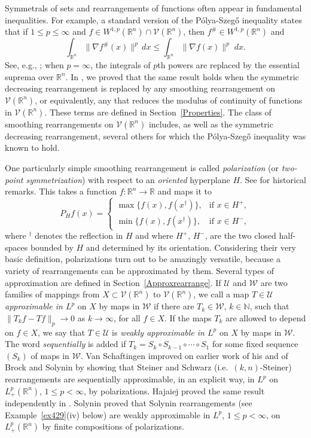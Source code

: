 \documentclass[12pt,reqno]{amsart}
\newcommand{\N}{{\mathbb N}}
\newcommand{\R}{{\mathbb R}}
\newcommand{\cV}{{\mathcal V}}
\newcommand{\cW}{{\mathcal W}}
\newcommand{\cU}{{\mathcal U}}
\numberwithin{equation}{section}
\begin{document}
Symmetrals of sets and rearrangements of functions often appear in fundamental inequalities.  For example, a standard version of the P\'olya-Szeg\H{o} inequality states that if $1\le p\le \infty$ and  $f\in W^{1,p}(\R^n)\cap \cV(\R^n)$, then $f^{\#}\in W^{1,p}(\R^n)$ and
$$
\int_{\R^n}\|\nabla f^{\#}(x)\|^p\, dx\leq \int_{\R^n}\|\nabla f(x)\|^p\; dx.
$$
See, e.g., \cite[Theorem~3.20 and~p.~113]{Baer}; when $p=\infty$, the integrals of $p$th powers are replaced by the essential suprema over $\R^n$. In \cite[Corollary~6.5]{BGGK2}, we proved that the same result holds when the symmetric decreasing rearrangement is replaced by any smoothing rearrangement on $\cV(\R^n)$, or equivalently, any that reduces the modulus of continuity of functions in $\cV(\R^n)$.  These terms are defined in Section~\ref{Properties}.  The class of smoothing rearrangements on $\cV(\R^n)$ includes, as well as the symmetric decreasing rearrangement, several others for which the P\'olya-Szeg\H{o} inequality was known to hold.

One particularly simple smoothing rearrangement is called {\em polarization} (or {\em two-point symmetrization}) with respect to an {\em oriented} hyperplane $H$.  See \cite[p.~3]{BGGK1} for historical remarks.  This takes a function $f:\R^n\to \R$ and maps it to
\begin{equation}\label{pol}
P_Hf(x)=\begin{cases}
\max\{f(x),f(x^{\dagger})\},& {\text{if $x\in H^+$,}}\\
\min\{f(x),f(x^{\dagger})\},& {\text{if $x\in H^-$}},
\end{cases}
\end{equation}
where $^{\dagger}$ denotes the reflection in $H$ and where $H^+$, $H^-$, are the two closed half-spaces bounded by $H$ and determined by its orientation.  Considering their very basic definition, polarizations turn out to be amazingly versatile, because a variety of rearrangements can be approximated by them. Several types of approximation are defined in Section~\ref{Approxrearrange}. If $\cU$ and $\cW$ are two families of mappings from $X\subset {\cV}(\R^n)$ to ${\cV}(\R^n)$, we call a map $T\in\cU$ {\em approximable in $L^p$} on $X$ by maps in $\cW$ if there are $T_k\in \cW$, $k\in \N$, such that $\|T_kf-Tf\|_p\to 0$ as $k\to \infty$, for all $f\in X$.  If the maps $T_k$ are allowed to depend on $f\in X$, we say that $T\in\cU$ is {\em weakly approximable in $L^p$} on $X$ by maps in $\cW$.  The word {\em sequentially} is added if $T_k=S_k\circ S_{k-1}\circ\cdots \circ S_1$ for some fixed sequence $(S_k)$ of maps in $\cW$.  Van Schaftingen \cite[Theorem~1]{VS2} improved on earlier work of his  \cite[Theorem~4.4]{VS1} and of Brock and Solynin \cite[Theorem~6.1]{BS} by showing that Steiner and Schwarz ({i.e.~$(k,n)$}-Steiner) rearrangements are sequentially approximable, in an explicit way, in $L^p$ on $L^p_+(\R^n)$, $1\le p<\infty$, by polarizations.  Hajaiej proved the same result independently in \cite{Haj}. Solynin \cite[Lemmas~7.4 and~9.2]{Sol1} proved that Solynin rearrangements (see Example~\ref{ex429}(iv) below) are weakly approximable in $L^p$, $1\le p<\infty$, on $L^p_+(\R^n)$ by finite compositions of polarizations.
\end{document}
